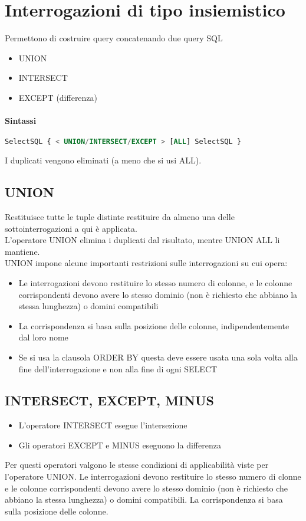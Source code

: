 \section{Interrogazioni di tipo insiemistico}
Permettono di costruire query concatenando due query SQL
\begin{itemize}
  \item UNION
  \item INTERSECT
  \item EXCEPT (differenza)
\end{itemize}
\paragraph*{Sintassi}
\begin{lstlisting}[language=SQL]
  SelectSQL { < UNION/INTERSECT/EXCEPT > [ALL] SelectSQL }
\end{lstlisting}
I duplicati vengono eliminati (a meno che si usi ALL).
\subsection{UNION}
Restituisce tutte le tuple distinte restituire da almeno una delle sottointerrogazioni a qui
è applicata.\\
L'operatore UNION elimina i duplicati dal risultato, mentre UNION ALL li mantiene.\\
UNION impone alcune importanti restrizioni sulle interrogazioni su cui opera:
\begin{itemize}
  \item Le interrogazioni devono restituire lo stesso numero di colonne, e le colonne corrispondenti devono avere
  lo stesso dominio (non è richiesto che abbiano la stessa lunghezza) o domini compatibili
  \item La corrispondenza si basa sulla posizione delle colonne, indipendentemente dal loro nome
  \item Se si usa la clausola ORDER BY questa deve essere usata una sola volta alla
  fine dell'interrogazione e non alla fine di ogni SELECT
\end{itemize}
\subsection{INTERSECT, EXCEPT, MINUS}
\begin{itemize}
  \item L'operatore INTERSECT esegue l'intersezione
  \item Gli operatori EXCEPT e MINUS eseguono la differenza
\end{itemize}
Per questi operatori valgono le stesse condizioni di applicabilità viste per l'operatore
UNION. Le interrogazioni devono restituire lo stesso numero di clonne e le colonne corrispondenti
devono avere lo stesso dominio (non è richiesto che abbiano la stessa lunghezza) o domini compatibili.
La corrispondenza si basa sulla posizione delle colonne.\\

